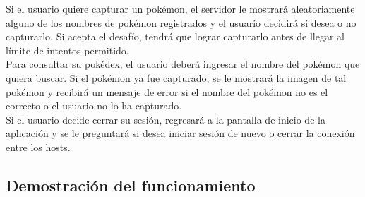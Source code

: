 \documentclass[12pt]{article}
\begin{document}
Si el usuario quiere capturar un pokémon, el servidor le mostrará aleatoriamente alguno de los nombres de pokémon registrados y el usuario decidirá si desea o no capturarlo. Si acepta el desafío, tendrá que lograr capturarlo antes de llegar al límite de intentos permitido. \\

Para consultar su pokédex, el usuario deberá ingresar el nombre del pokémon que quiera buscar. Si el pokémon ya fue capturado, se le mostrará la imagen de tal pokémon y recibirá un mensaje de error si el nombre del pokémon no es el correcto o el usuario no lo ha capturado. \\

Si el usuario decide cerrar su sesión, regresará a la pantalla de inicio de la aplicación y se le preguntará si desea iniciar sesión de nuevo o cerrar la conexión entre los hosts. \\

\subsection{Demostración del funcionamiento}
\end{document}
